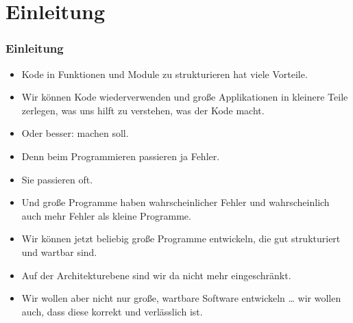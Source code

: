 \documentclass[aspectratio=169,mathserif,notheorems]{beamer}%
\subtitle{28.~Zwischenspiel: Unit Tests}%
\begin{document}
%
%
\startPresentation%
%
\section{Einleitung}%
\begin{frame}%
\frametitle{Einleitung}%
\begin{itemize}%
%
\item Kode in Funktionen und Module zu strukturieren hat viele Vorteile.%
%
\item<2-> Wir können Kode wiederverwenden und große Applikationen in kleinere Teile zerlegen, was uns hilft zu verstehen, was der Kode macht.%
%
\item<3-> Oder besser: \alert{machen soll}.%
%
\item<4-> Denn beim Programmieren passieren ja Fehler.%
%
\item<5-> Sie passieren oft.%
%
\item<6-> Und große Programme haben wahrscheinlicher Fehler und wahrscheinlich auch mehr Fehler als kleine Programme.%
%
\item<7-> Wir können jetzt beliebig große Programme entwickeln, die gut strukturiert und wartbar sind.%
%
\item<8-> Auf der Architekturebene sind wir da nicht mehr eingeschränkt.%
%
\item<9-> Wir wollen aber nicht nur große, wartbare Software entwickeln {\dots} wir wollen auch, dass diese korrekt und verlässlich ist.%
%
\end{itemize}%
\end{frame}%
%
\end{document}
